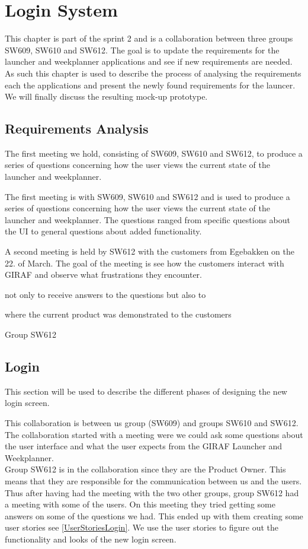 \chapter{Login System}\label{sec:LoginColab}
This chapter is part of the sprint 2 and is a collaboration between three
groups SW609, SW610 and SW612. The goal is to update the requirements for the
launcher and weekplanner applications and see if new requirements are needed.
As such this chapter is used to describe the process of analysing the
requirements each the applications and present the newly found requirements for
the launcer. We will finally discuss the resulting mock-up prototype.

\section{Requirements Analysis}


The first meeting we hold, consisting of SW609, SW610 and SW612,  to produce a
series of questions concerning how the user views the current state of the
launcher and weekplanner.


 The first meeting is with SW609, SW610 and SW612 and
is used to produce a series of questions concerning how the user views the current state of the
launcher and weekplanner. The questions ranged from specific questions about the
UI to general questions about added functionality.


A second meeting is held by SW612 with the customers from Egebakken on the 22.
of March. The goal of the meeting is see how the customers interact with GIRAF
and observe what frustrations they encounter. 


not only to receive answers to the
questions but also to 

 where the current product was demonstrated to the customers



Group SW612 


\section{Login}
This section will be used to describe the different phases of designing the new
login screen.

This collaboration is between us group (SW609) and groups SW610 and SW612. The
collaboration started with a meeting were we could ask some questions about the
user interface and what the user expects from the GIRAF Launcher and
Weekplanner. \\
Group SW612 is in the collaboration since they are the Product Owner. This means
that they are responsible for the communication between us and the users. Thus
after having had the meeting with the two other groups, group SW612 had a
meeting with some of the users. On this meeting they tried getting some answers
on some of the questions we had. This ended up with them creating some user
stories see \autoref{UserStoriesLogin}. We use the user stories to figure out
the functionality and looks of the new login screen. 

